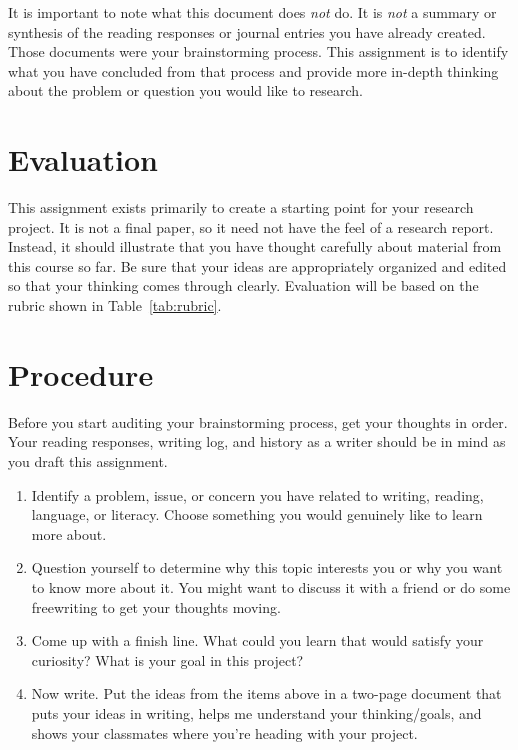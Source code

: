 \documentclass[12pt,oneside]{amsart}	%
\begin{document}
 It is important to note what this document does \emph{not} do. It is \emph{not} a summary or synthesis of the reading responses or journal entries you have already created. Those documents were your brainstorming process. This assignment is to identify what you have concluded from that process and provide more in-depth thinking about the problem or question you would like to research.

\section{Evaluation} %
\label{sec:evaluation}
This assignment exists primarily to create a starting point for your research project. It is not a final paper, so it need not have the feel of a research report. Instead, it should illustrate that you have thought carefully about material from this course so far. Be sure that your ideas are appropriately organized and edited so that your thinking comes through clearly. Evaluation will be based on the rubric shown in Table~\ref{tab:rubric}.

\section{Procedure} %
\label{sec:procedure}
Before you start auditing your brainstorming process, get your thoughts in order. Your reading responses, writing log, and history as a writer should be in mind as you draft this assignment.
\begin{enumerate}
	\item Identify a problem, issue, or concern you have related to writing, reading, language, or literacy. Choose something you would genuinely like to learn more about.
	\item Question yourself to determine why this topic interests you or why you want to know more about it. You might want to discuss it with a friend or do some freewriting to get your thoughts moving.
	\item Come up with a finish line. What could you learn that would satisfy your curiosity? What is your goal in this project?
	\item Now write. Put the ideas from the items above in a two-page document that puts your ideas in writing, helps me understand your thinking/goals, and shows your classmates where you're heading with your project.
\end{enumerate}
\end{document}
